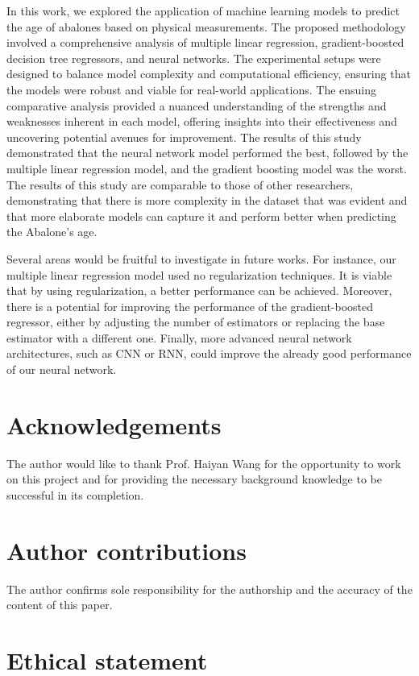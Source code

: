 \documentclass[12pt]{article}
\begin{document}
In this work, we explored the application of machine learning models to predict the age of abalones based on physical measurements. The proposed methodology involved a comprehensive analysis of multiple linear regression, gradient-boosted decision tree regressors, and neural networks. The experimental setups were designed to balance model complexity and computational efficiency, ensuring that the models were robust and viable for real-world applications. The ensuing comparative analysis provided a nuanced understanding of the strengths and weaknesses inherent in each model, offering insights into their effectiveness and uncovering potential avenues for improvement. The results of this study demonstrated that the neural network model performed the best, followed by the multiple linear regression model, and the gradient boosting model was the worst. The results of this study are comparable to those of other researchers, demonstrating that there is more complexity in the dataset that was evident and that more elaborate models can capture it and perform better when predicting the Abalone's age.

Several areas would be fruitful to investigate in future works. For instance, our multiple linear regression model used no regularization techniques. It is viable that by using regularization, a better performance can be achieved. Moreover, there is a potential for improving the performance of the gradient-boosted regressor, either by adjusting the number of estimators or replacing the base estimator with a different one. Finally, more advanced neural network architectures, such as CNN or RNN, could improve the already good performance of our neural network.

\section*{Acknowledgements}

The author would like to thank Prof. Haiyan Wang for the opportunity to work on this project and for providing the necessary background knowledge to be successful in its completion.

\section*{Author contributions}

The author confirms sole responsibility for the authorship and the accuracy of the content of this paper.

\section*{Ethical statement}
\end{document}

